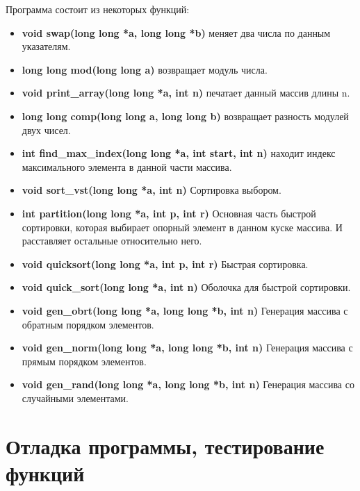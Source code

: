 \documentclass[a4paper,12pt,titlepage,final]{article}
\begin{document}
Программа состоит из некоторых функций:
\begin{itemize}
  \item {\bf \ttfamily void swap(long long *a, long long *b)} меняет два числа по данным указателям.
  \item {\bf \ttfamily long long mod(long long a)} возвращает модуль числа.
  \item {\bf \ttfamily void print\_array(long long *a, int n)} печатает данный массив длины n.
  \item {\bf \ttfamily long long comp(long long a, long long b)} возвращает разность модулей двух чисел.
  \item {\bf \ttfamily int find\_max\_index(long long *a, int start, int n)} находит индекс максимального элемента в данной части массива.
  \item {\bf \ttfamily void sort\_vst(long long *a, int n)} Сортировка выбором.
  \item {\bf \ttfamily int partition(long long *a, int p, int r)} Основная часть быстрой сортировки, которая выбирает опорный элемент в данном куске массива. И расставляет остальные относительно него.
  \item {\bf \ttfamily void quicksort(long long *a, int p, int r)} Быстрая сортировка.
  \item {\bf \ttfamily void quick\_sort(long long *a, int n)} Оболочка для быстрой сортировки.
  \item {\bf \ttfamily void gen\_obrt(long long *a, long long *b, int n)} Генерация массива с обратным порядком элементов.
  \item {\bf \ttfamily void gen\_norm(long long *a, long long *b, int n)} Генерация массива с прямым порядком элементов.
  \item {\bf \ttfamily void gen\_rand(long long *a, long long *b, int n)} Генерация массива со случайными элементами.
\end{itemize}

\newpage

\section{Отладка программы, тестирование функций}
\end{document}
